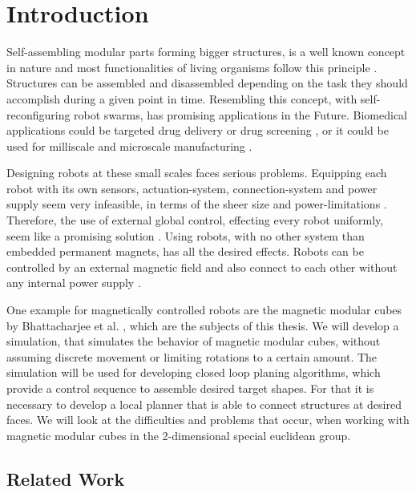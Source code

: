 \chapter{Introduction}

Self-assembling modular parts forming bigger structures, is a well known concept in nature and most functionalities of living organisms follow this principle \cite{bishop2005}.
Structures can be assembled and disassembled depending on the task they should accomplish during a given point in time. 
Resembling this concept, with self-reconfiguring robot swarms, has promising applications in the Future.
Biomedical applications could be targeted drug delivery or drug screening \cite{sitti2015}, or it could be used for milliscale and microscale manufacturing \cite{pelrine2016}.

Designing robots at these small scales faces serious problems.
Equipping each robot with its own sensors, actuation-system, connection-system and power supply seem very infeasible, in terms of the sheer size and power-limitations \cite{white2007}.
Therefore, the use of external global control, effecting every robot uniformly, seem like a promising solution \cite{white2007}.
Using robots, with no other system than embedded permanent magnets, has all the desired effects.
Robots can be controlled by an external magnetic field and also connect to each other without any internal power supply \cite{saab2019}.

One example for magnetically controlled robots are the magnetic modular cubes by Bhattacharjee et al. \cite{Bhattacharjee2022}, which are the subjects of this thesis.
We will develop a simulation, that simulates the behavior of magnetic modular cubes, without assuming discrete movement or limiting rotations to a certain amount.
The simulation will be used for developing closed loop planing algorithms, which provide a control sequence to assemble desired target shapes.
For that it is necessary to develop a local planner that is able to connect structures at desired faces.
We will look at the difficulties and problems that occur, when working with magnetic modular cubes in the 2-dimensional special euclidean group.


\section{Related Work}

